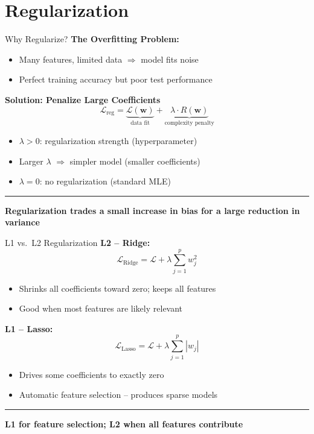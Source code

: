 \documentclass[8pt,aspectratio=169]{beamer}
\newcommand{\bottomnote}[1]{%
\vfill
\vspace{-2mm}
\textcolor{mllavender2}{\rule{\textwidth}{0.4pt}}
\vspace{1mm}
\footnotesize
\textbf{#1}
}
\begin{document}
\section{Regularization}

\begin{frame}[t]{Why Regularize?}
\textbf{The Overfitting Problem:}
\begin{itemize}
\item Many features, limited data $\Rightarrow$ model fits noise
\item Perfect training accuracy but poor test performance
\end{itemize}
\vspace{0.5em}
\textbf{Solution: Penalize Large Coefficients}
$$\mathcal{L}_{\text{reg}} = \underbrace{\mathcal{L}(\mathbf{w})}_{\text{data fit}} + \underbrace{\lambda \cdot R(\mathbf{w})}_{\text{complexity penalty}}$$
\begin{itemize}
\item $\lambda > 0$: regularization strength (hyperparameter)
\item Larger $\lambda$ $\Rightarrow$ simpler model (smaller coefficients)
\item $\lambda = 0$: no regularization (standard MLE)
\end{itemize}
\bottomnote{Regularization trades a small increase in bias for a large reduction in variance}
\end{frame}

\begin{frame}[t]{L1 vs.\ L2 Regularization}
\textbf{L2 -- Ridge:}
$$\mathcal{L}_{\text{Ridge}} = \mathcal{L} + \lambda \sum_{j=1}^{p} w_j^2$$
\begin{itemize}
\item Shrinks all coefficients toward zero; keeps all features
\item Good when most features are likely relevant
\end{itemize}
\vspace{0.3em}
\textbf{L1 -- Lasso:}
$$\mathcal{L}_{\text{Lasso}} = \mathcal{L} + \lambda \sum_{j=1}^{p} |w_j|$$
\begin{itemize}
\item Drives some coefficients to exactly zero
\item Automatic feature selection -- produces sparse models
\end{itemize}
\bottomnote{L1 for feature selection; L2 when all features contribute}
\end{frame}
\end{document}
